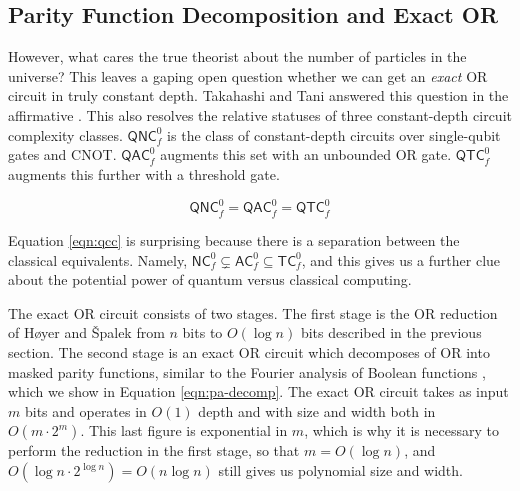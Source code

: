 
\subsection{Parity Function Decomposition and Exact \textsc{OR}}

However, what cares the true theorist about the number of particles in the
universe? This leaves
a gaping open question whether we can get an \emph{exact} \textsc{OR} circuit in truly
constant depth. Takahashi and Tani answered this question in the
affirmative \cite{Takahashi2011}.
This also resolves the relative statuses of
three constant-depth circuit complexity classes. $\textsf{QNC}^0_f$ is the
class of constant-depth circuits over single-qubit gates and CNOT.
$\textsf{QAC}^0_f$ augments this set with an unbounded \textsc{OR} gate.
$\textsf{QTC}^0_f$ augments this further with a threshold gate.

\begin{equation}
\label{eqn:qcc}
\textsf{QNC}_f^0 = \textsf{QAC}_f^0 = \textsf{QTC}_f^0
\end{equation}

Equation \ref{eqn:qcc} is surprising because there is a separation between
the classical equivalents.
Namely, $\textsf{NC}^0_f \subsetneq \textsf{AC}^0_f \subseteq \textsf{TC}^0_f$,
and this gives us a further clue about the potential power of quantum
versus classical computing.

The exact \textsc{OR} circuit consists of two stages. The first stage is the
\textsc{OR}
reduction of H{\o}yer and {\v S}palek from $n$ bits to $O(\log n)$ bits
described in the previous section.
The second stage is an exact \textsc{OR} circuit which 
decomposes of \textsc{OR} into masked parity functions,
similar to the Fourier analysis of Boolean functions \cite{ODonnell2008},
which we show in Equation \ref{eqn:pa-decomp}.
The exact \textsc{OR} circuit takes as input $m$ bits and operates in
$O(1)$ depth and with
size and width both in $O(m\cdot2^m)$. This last figure is exponential in $m$,
which is why it is necessary to perform the reduction in the first stage,
so that $m = O(\log n)$, and $O(\log n \cdot 2^{\log n}) = O(n \log n)$ still
gives us polynomial size and width.

